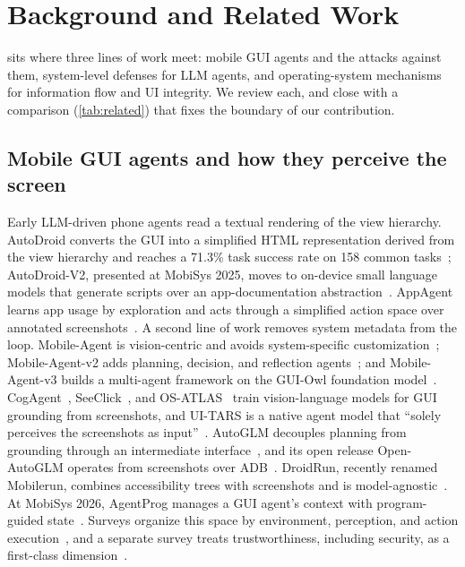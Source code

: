 \section{Background and Related Work}\label{sec:related}

\PG{} sits where three lines of work meet: mobile GUI agents and the attacks against them, system-level defenses for LLM agents, and operating-system mechanisms for information flow and UI integrity. We review each, and close with a comparison (\cref{tab:related}) that fixes the boundary of our contribution.

\subsection{Mobile GUI agents and how they perceive the screen}\label{sec:rw-agents}

Early LLM-driven phone agents read a textual rendering of the view hierarchy. AutoDroid converts the GUI into a simplified HTML representation derived from the view hierarchy and reaches a 71.3\% task success rate on 158 common tasks~\cite{wen2024autodroid}; AutoDroid-V2, presented at MobiSys 2025, moves to on-device small language models that generate scripts over an app-documentation abstraction~\cite{wen2025autodroidv2}. AppAgent learns app usage by exploration and acts through a simplified action space over annotated screenshots~\cite{zhang2025appagent}. A second line of work removes system metadata from the loop. Mobile-Agent is vision-centric and avoids system-specific customization~\cite{wang2024mobileagent}; Mobile-Agent-v2 adds planning, decision, and reflection agents~\cite{wang2024mobileagentv2}; and Mobile-Agent-v3 builds a multi-agent framework on the GUI-Owl foundation model~\cite{ye2025mobileagentv3}. CogAgent~\cite{hong2024cogagent}, SeeClick~\cite{cheng2024seeclick}, and OS-ATLAS~\cite{wu2025osatlas} train vision-language models for GUI grounding from screenshots, and UI-TARS is a native agent model that ``solely perceives the screenshots as input''~\cite{qin2025uitars}. AutoGLM decouples planning from grounding through an intermediate interface~\cite{liu2024autoglm}, and its open release Open-AutoGLM operates from screenshots over ADB~\cite{openautoglm2025software}. DroidRun, recently renamed Mobilerun, combines accessibility trees with screenshots and is model-agnostic~\cite{droidrun2025software}. At MobiSys 2026, AgentProg manages a GUI agent's context with program-guided state~\cite{tian2026agentprog}. Surveys organize this space by environment, perception, and action execution~\cite{zhang2025llmbrainedguiagents}, and a separate survey treats trustworthiness, including security, as a first-class dimension~\cite{shi2025trustworthyguiagents}.


